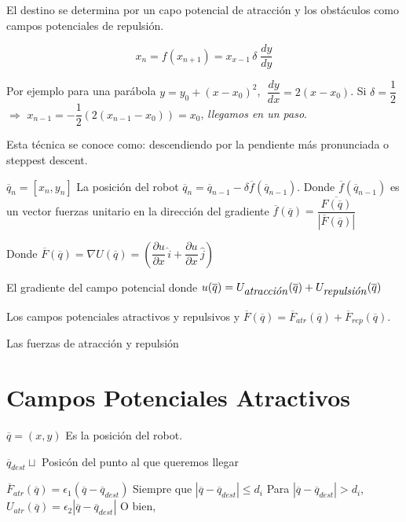 El destino se determina por un capo potencial de atracción y los obstáculos como campos potenciales de repulsión.


$$x_{n} = f(x_{n + 1}) = x_{x - 1} \, \delta \; \dfrac{dy}{dy}$$

Por ejemplo para una parábola $y = y_{0} + (x - x_{0})^2$,  $\;\dfrac{dy}{dx} = 2(x - x_{0})$. Si $\delta = \dfrac{1}{2}$ $\Rightarrow$ $x_{n - 1} = -\dfrac{1}{2} (2(x_{n - 1} - x_{0})) = x_{0}$, \textit{llegamos en un paso}.

Esta técnica se conoce como: descendiendo por la pendiente más pronunciada o steppest descent.

$\overline{q}_{n} = [x_n,y_n]$ La posición del robot $\overline{q}_{n} = \overline{q}_{n - 1} - \delta \overline{f} \left( \overline{q}_{n - 1} \right)$. Donde $\overline{f} \left( \overline{q}_{n - 1}\right)$ es un vector fuerzas unitario en la dirección del gradiente $\overline{f}(\overline{q}) = \dfrac{\overline{F(\overline{q})}}{\left| \overline{F}(\overline{q})\right|}$ 

Donde $\overline{F}(\overline{q}) = \nabla U(\overline{q}) = \left( \dfrac{\partial u}{\partial x} \,\hat{i} + \dfrac{\partial u}{\partial x}\, \hat{j} \right)$ 

El gradiente del campo potencial donde $u(\overline{q}) = U_{\mbox{\textit{atracción}}}(\overline{q}) + U_{\mbox{\textit{repulsión}}}(\overline{q})$

Los campos potenciales atractivos y repulsivos y $\overline{F}(\overline{q}) = \overline{F}_{atr}(\overline{q}) + \overline{F}_{rep}(\overline{q})$.

Las fuerzas de atracción y repulsión




\section{Campos Potenciales Atractivos}

$\overline{q} = (x,y)$ Es la posición del robot.

$\overline{q}_{dest} \sqcup$ Posicón del punto al que queremos llegar

$\overline{F}_{atr}(\overline{q}) = \epsilon_{1} (\overline{q} - \overline{q}_{dest})$ Siempre que $\left| \overline{q} - \overline{q}_{dest} \right| \leq d_{i}$ Para $\left| \overline{q} - \overline{q}_{dest} \right| > d_{i}$, $U_{atr}(\overline{q}) = \epsilon_{2} \left| \overline{q} - \overline{q}_{dest} \right|$ O bien, 


